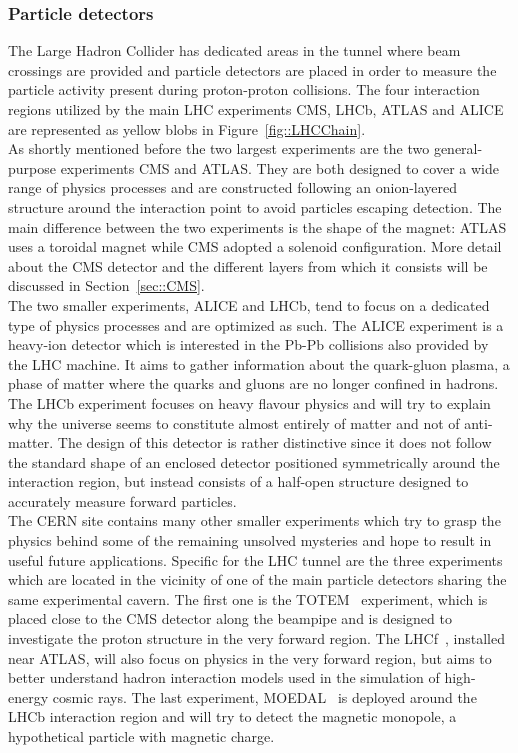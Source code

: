 \subsubsection{Particle detectors}
The Large Hadron Collider has dedicated areas in the tunnel where beam crossings are provided and particle detectors are placed in order to measure the particle activity present during proton-proton collisions. The four interaction regions utilized by the main LHC experiments CMS, LHCb, ATLAS and ALICE are represented as yellow blobs in Figure~\ref{fig::LHCChain}. 
\\
As shortly mentioned before the two largest experiments are the two general-purpose experiments CMS and ATLAS. They are both designed to cover a wide range of physics processes and are constructed following an onion-layered structure around the interaction point to avoid particles escaping detection. The main difference between the two experiments is the shape of the magnet: ATLAS uses a toroidal magnet while CMS adopted a solenoid configuration. 
More detail about the CMS detector and the different layers from which it consists will be discussed in Section~\ref{sec::CMS}.
\\
The two smaller experiments, ALICE and LHCb, tend to focus on a dedicated type of physics processes and are optimized as such. The ALICE experiment is a heavy-ion detector which is interested in the Pb-Pb collisions also provided by the LHC machine. It aims to gather information about the quark-gluon plasma, a phase of matter where the quarks and gluons are no longer confined in hadrons. The LHCb experiment focuses on heavy flavour physics and will try to explain why the universe seems to constitute almost entirely of matter and not of anti-matter. The design of this detector is rather distinctive since it does not follow the standard shape of an enclosed detector positioned symmetrically around the interaction region, but instead consists of a half-open structure designed to accurately measure forward particles.
\\
The CERN site contains many other smaller experiments which try to grasp the physics behind some of the remaining unsolved mysteries and hope to result in useful future applications. 
Specific for the LHC tunnel are the three experiments which are located in the vicinity of one of the main particle detectors sharing the same experimental cavern.
The first one is the TOTEM~\cite{TotemDetectorPaper} experiment, which is placed close to the CMS detector along the beampipe and is designed to investigate the proton structure %
in the very forward region. The LHCf~\cite{LHCfDetectorPaper}, installed near ATLAS, will also focus on physics in the very forward region, but aims to better understand hadron interaction models used in the simulation of high-energy cosmic rays.
The last experiment, MOEDAL~\cite{MoedalDetectorPaper} is deployed around the LHCb interaction region and will try to detect the magnetic monopole, a hypothetical particle with magnetic charge.

